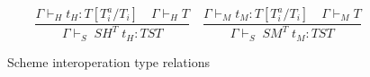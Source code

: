 \begin{figure}
\[
\frac{\Gamma\vdash_{H}t_{H}:T[T^{a}_{i}/T_{i}]\quad\Gamma\vdash_{H}T}{\Gamma\vdash_{S}\;SH^{T}\;t_{H}:TST}
\quad
\frac{\Gamma\vdash_{M}t_{M}:T[T^{a}_{i}/T_{i}]\quad\Gamma\vdash_{M}T}{\Gamma\vdash_{S}\;SM^{T}\;t_{M}:TST}
\]
\caption{Scheme interoperation type relations}
\label{sitr}
\end{figure}
